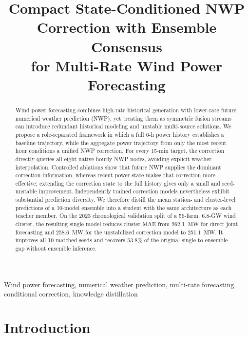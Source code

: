 \documentclass[conference]{IEEEtran}
\begin{document}
\title{Compact State-Conditioned NWP Correction with Ensemble Consensus\\
for Multi-Rate Wind Power Forecasting}

\author{
\IEEEauthorblockN{[Authors]}
\IEEEauthorblockA{[Affiliation]}
}

\maketitle

\begin{abstract}
Wind power forecasting combines high-rate historical generation with lower-rate future numerical weather prediction (NWP), yet treating them as symmetric fusion streams can introduce redundant historical modeling and unstable multi-source solutions. We propose a role-separated framework in which a full 6-h power history establishes a baseline trajectory, while the aggregate power trajectory from only the most recent hour conditions a unified NWP correction. For every 15-min target, the correction directly queries all eight native hourly NWP nodes, avoiding explicit weather interpolation. Controlled ablations show that future NWP supplies the dominant correction information, whereas recent power state makes that correction more effective; extending the correction state to the full history gives only a small and seed-unstable improvement. Independently trained correction models nevertheless exhibit substantial prediction diversity. We therefore distill the mean station- and cluster-level predictions of a 10-model ensemble into a student with the same architecture as each teacher member. On the 2023 chronological validation split of a 56-farm, 6.8-GW wind cluster, the resulting single model reduces cluster MAE from 262.1~MW for direct joint forecasting and 258.6~MW for the unstabilized correction model to 251.1~MW. It improves all 10 matched seeds and recovers 53.8\% of the original single-to-ensemble gap without ensemble inference.
\end{abstract}

\begin{IEEEkeywords}
Wind power forecasting, numerical weather prediction, multi-rate forecasting, conditional correction, knowledge distillation
\end{IEEEkeywords}

\section{Introduction}
\end{document}
